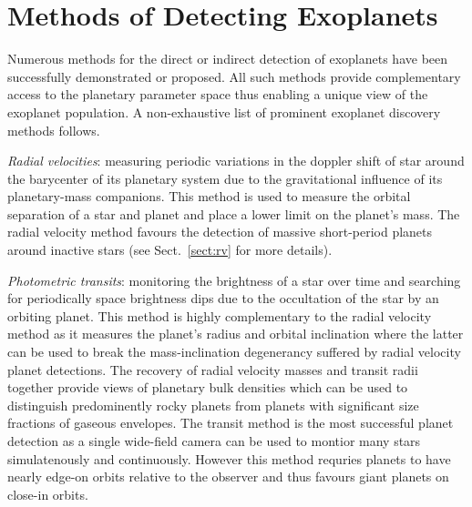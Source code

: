\section{Methods of Detecting Exoplanets} \label{sect:detection}
Numerous methods for the direct or indirect detection of exoplanets
have been successfully demonstrated or proposed. All such methods provide complementary
access to the planetary parameter space thus enabling a unique view of the exoplanet
population. A non-exhaustive list of prominent exoplanet discovery methods follows.


\emph{Radial velocities}: measuring periodic variations in the doppler shift of star
around the barycenter of its planetary system due to the gravitational influence of
its planetary-mass companions. This method is used to measure the orbital separation of a
star and planet and place a lower limit on the planet's mass. The radial velocity
method favours the detection of massive short-period planets around inactive stars
(see Sect.~\ref{sect:rv} for more details).

\emph{Photometric transits}: monitoring the brightness of a star over time and
searching for periodically space brightness dips due to the occultation of the star
by an orbiting planet. This method is highly complementary to the radial velocity method
as it measures the planet's radius and orbital inclination where the latter can be
used to break the mass-inclination degenerancy suffered by radial velocity planet
detections. The recovery of radial velocity masses and transit radii together provide
views of planetary bulk densities which can be used to distinguish predominently
rocky planets from planets with significant size fractions of gaseous envelopes.
The transit method is the most successful planet detection as a single
wide-field camera can be used to montior many stars simulatenously and continuously.
However this method requries planets to have nearly edge-on orbits relative to the observer
and thus favours giant planets on close-in orbits.

